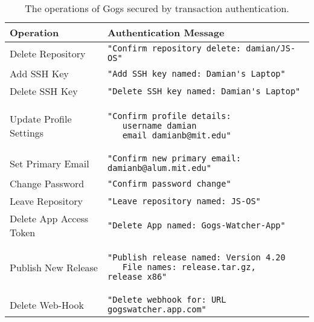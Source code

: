 \begin{table}[h]
\centering

\begin{tabular}{ m{5cm} m{9cm}  } 
 \hline
 Operation & Authentication Message \\ 
 \hline \hline

 Delete Repository & \lstinline{"Confirm repository delete: damian/JS-OS"} \\ \hline

 Add SSH Key & \lstinline{"Add SSH key named: Damian's Laptop"} \\ \hline

 Delete SSH Key & \lstinline{"Delete SSH key named: Damian's Laptop"} \\ \hline

 Update Profile Settings & 
 \begin{lstlisting} 
"Confirm profile details:
   username damian
   email damianb@mit.edu"
\end{lstlisting} 
\\ \hline

 Set Primary Email & \lstinline{"Confirm new primary email: damianb@alum.mit.edu"} \\ \hline

 Change Password & \lstinline{"Confirm password change"} \\ \hline

 Leave Repository & \lstinline{"Leave repository named: JS-OS"} \\ \hline

 Delete App Access Token & \lstinline{"Delete App named: Gogs-Watcher-App"} \\ \hline

 Publish New Release &
 \begin{lstlisting} 
"Publish release named: Version 4.20
   File names: release.tar.gz, release_x86"
\end{lstlisting} 
\\ \hline

  Delete Web-Hook & \lstinline{"Delete webhook for: URL gogswatcher.app.com"} \\ \hline

\end{tabular}
\caption{The operations of Gogs secured by transaction authentication.}
\label{Table:GogsSecuredRoutes}
\end{table}

